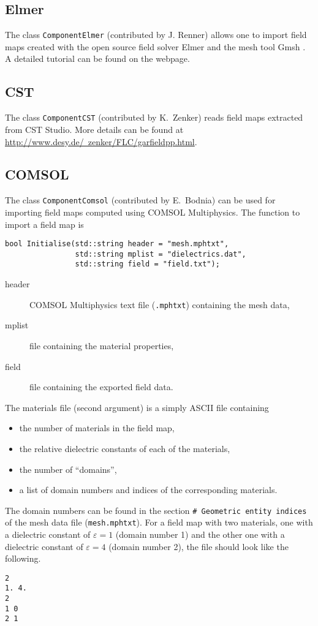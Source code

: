 \subsection{Elmer}

The class \texttt{ComponentElmer} (contributed by J. Renner) allows one to import 
field maps created with the open source field solver Elmer \cite{Elmer}
and the mesh tool Gmsh \cite{Gmsh}. 
A detailed tutorial can be found on the webpage. 

\subsection{CST}

The class \texttt{ComponentCST} (contributed by K.~Zenker) reads field maps 
extracted from CST Studio. More details can be found at 
\href{http://www.desy.de/~zenker/FLC/garfieldpp.html}{http://www.desy.de/~zenker/FLC/garfieldpp.html}.

\subsection{COMSOL}

The class \texttt{ComponentComsol} (contributed by E.~Bodnia) can be used for 
importing field maps computed using COMSOL Multiphysics.
The function to import a field map is 
\begin{lstlisting}
bool Initialise(std::string header = "mesh.mphtxt",
                std::string mplist = "dielectrics.dat",
                std::string field = "field.txt");
\end{lstlisting}
\begin{description}
  \item[header] COMSOL Multiphysics text file (\texttt{.mphtxt}) containing the mesh data,
  \item[mplist] file containing the material properties, 
  \item[field] file containing the exported field data. 
\end{description}
The materials file (second argument) is a simply ASCII file containing
\begin{itemize}
  \item
  the number of materials in the field map, 
  \item
  the relative dielectric constants of each of the materials,
  \item
  the number of ``domains'',
  \item
  a list of domain numbers and indices of the corresponding materials.
\end{itemize}
The domain numbers can be found in the section 
\texttt{\# Geometric entity indices} of the mesh data file 
(\texttt{mesh.mphtxt}).
For a field map with two materials, 
one with a dielectric constant of $\varepsilon = 1$ (domain number 1) and 
the other one with a dielectric constant of $\varepsilon = 4$ 
(domain number 2), the file should look like the following.
\begin{lstlisting}
2
1. 4. 
2
1 0
2 1
\end{lstlisting}

